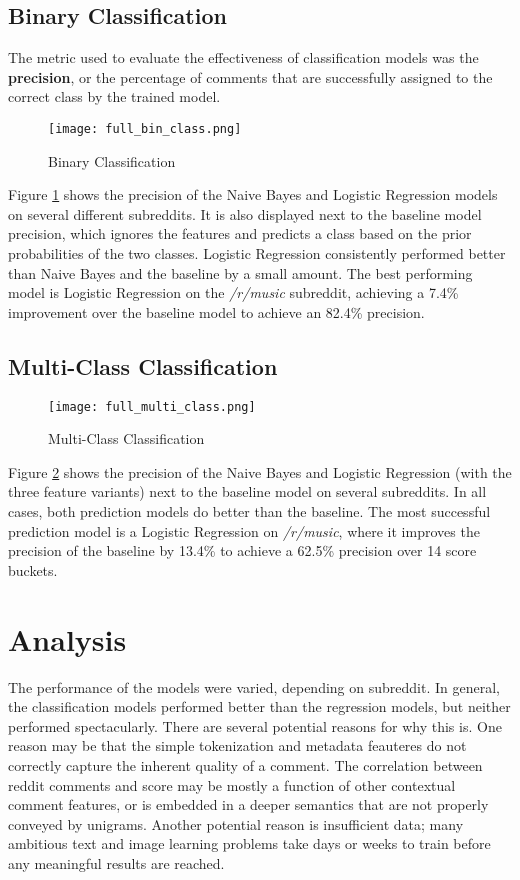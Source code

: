 \documentclass[11pt, twocolumn]{article}
\begin{document}
	\subsection{Binary Classification}
	The metric used to evaluate the effectiveness of classification models was the \textbf{precision}, or the percentage of comments that are successfully assigned to the correct class by the trained model.
	
	\begin{figure}[h!]
	\centering
	\texttt{[image: full\_bin\_class.png]}
	\caption{Binary Classification}
	\label{full_bin_class}
	\end{figure}
	
	Figure \ref{full_bin_class} shows the precision of the Naive Bayes and Logistic Regression models on several different subreddits. It is also displayed next to the baseline model precision, which ignores the features and predicts a class based on the prior probabilities of the two classes. Logistic Regression consistently performed better than Naive Bayes and the baseline by a small amount. The best performing model is Logistic Regression on the \textit{/r/music} subreddit, achieving a 7.4\% improvement over the baseline model to achieve an 82.4\% precision.

	\subsection{Multi-Class Classification}
	
	\begin{figure}[h!]
	\centering
	\texttt{[image: full\_multi\_class.png]}
	\caption{Multi-Class Classification}
	\label{full_multi_class}
	\end{figure}

	Figure \ref{full_multi_class} shows the precision of the Naive Bayes and Logistic Regression (with the three feature variants) next to the baseline model on several subreddits. In all cases, both prediction models do better than the baseline. The most successful prediction model is a Logistic Regression on \textit{/r/music}, where it improves the precision of the baseline by 13.4\% to achieve a 62.5\% precision over 14 score buckets.
	
\section{Analysis}

	The performance of the models were varied, depending on subreddit. In general, the classification models performed better than the regression models, but neither performed spectacularly. There are several potential reasons for why this is. One reason may be that the simple tokenization and metadata feauteres do not correctly capture the inherent quality of a comment. The correlation between reddit comments and score may be mostly a function of other contextual comment features, or is embedded in a deeper semantics that are not properly conveyed by unigrams. Another potential reason is insufficient data; many ambitious text and image learning problems take days or weeks to train before any meaningful results are reached.
\end{document}
